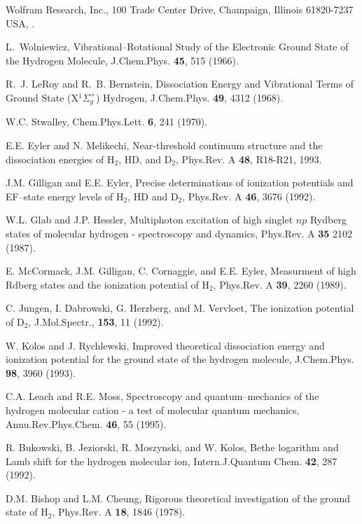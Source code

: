 \begin{thebibliography}{999}
Wolfram Research, Inc., 
100 Trade Center Drive, Champaign, Illinois 61820-7237
USA,
.

L.~Wolniewicz,
Vibrational--Rotational Study of the Electronic Ground State 
of the Hydrogen Molecule,
\newblock J.Chem.Phys. {\bf 45}, 515 (1966).

R.~J. Le{R}oy and R.~B. Bernstein,
Dissociation Energy and Vibrational Terms of Ground State 
(X$^{1} \Sigma _g ^+$) Hydrogen,
\newblock  J.Chem.Phys. {\bf 49}, 4312 (1968).



W.C. Stwalley, Chem.Phys.Lett. {\bf 6}, 241 (1970).

E.E. Eyler and N. Melikechi, Near-threshold continuum structure
and the dissociation energies of H$_2$, HD, and D$_2$,
Phys.Rev. A {\bf 48}, R18-R21, 1993.

J.M. Gilligan and E.E. Eyler,
Precise determinations of ionization potentials and EF--state
energy levels of H$_2$, HD and D$_2$,
Phys.Rev. A {\bf 46}, 3676 (1992).

W.L. Glab and J.P. Hessler,
Multiphoton excitation of high singlet $np$ Rydberg states of
molecular hydrogen - spectroscopy and dynamics,
Phys.Rev. A {\bf 35} 2102 (1987).

E. McCormack, J.M. Gilligan, C. Cornaggie, and E.E. Eyler,
Measurment of high Rdberg states and the ionization potential
of H$_2$,
Phys.Rev. A {\bf 39}, 2260 (1989).

C. Jungen, I. Dabrowski, G. Herzberg, and M. Vervloet,
The ionization potential of D$_2$,
J.Mol.Spectr., {\bf 153}, 11 (1992).

W. Kolos and J. Rychlewski,
Improved theoretical dissociation energy and
ionization potential for the ground state of the
hydrogen molecule,
J.Chem.Phys. {\bf 98}, 3960 (1993).


C.A. Leach and R.E. Moss,
Spectroscopy and quantum--mechanics of the hydrogen 
molecular cation - a test of molecular quantum mechanics,
Annu.Rev.Phys.Chem. {\bf 46}, 55 (1995). 


R. Bukowski, B. Jeziorski, R. Moszynski, and W. Kolos,
Bethe logarithm and Lamb shift for the hydrogen molecular 
ion,
Intern.J.Quantum Chem. {\bf 42}, 287 (1992).

D.M. Bishop and L.M. Cheung,
Rigorous theoretical investigation of the ground state of H$_2$,
Phys.Rev. A {\bf 18}, 1846 (1978).


\end{thebibliography}
